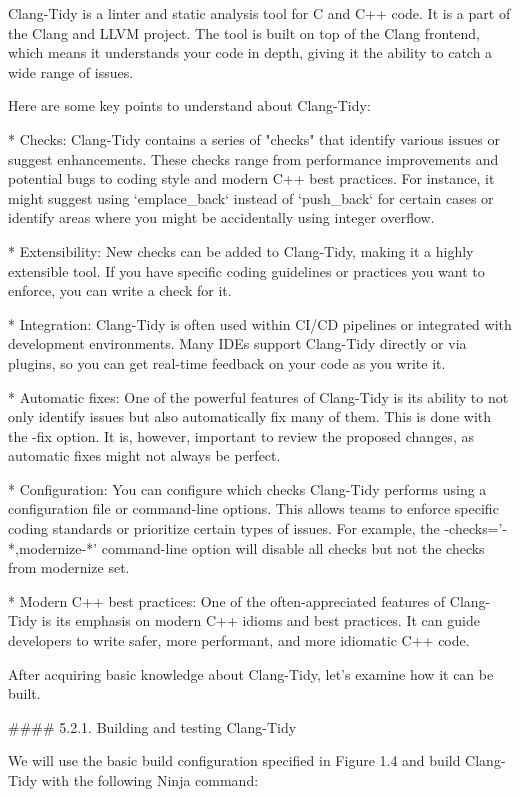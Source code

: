 
\begin{markdown}

Clang-Tidy is a linter and static analysis tool for C and C++ code. It is a part of the Clang and LLVM project. The tool is built on top of the Clang frontend, which means it understands your code in depth, giving it the ability to catch a wide range of issues.

Here are some key points to understand about Clang-Tidy:

* Checks: Clang-Tidy contains a series of "checks" that identify various issues or suggest enhancements. These checks range from performance improvements and potential bugs to coding style and modern C++ best practices. For instance, it might suggest using `emplace_back` instead of `push_back` for certain cases or identify areas where you might be accidentally using integer overflow.

* Extensibility: New checks can be added to Clang-Tidy, making it a highly extensible tool. If you have specific coding guidelines or practices you want to enforce, you can write a check for it.

* Integration: Clang-Tidy is often used within CI/CD pipelines or integrated with development environments. Many IDEs support Clang-Tidy directly or via plugins, so you can get real-time feedback on your code as you write it.

* Automatic fixes: One of the powerful features of Clang-Tidy is its ability to not only identify issues but also automatically fix many of them. This is done with the -fix option. It is, however, important to review the proposed changes, as automatic fixes might not always be perfect.

* Configuration: You can configure which checks Clang-Tidy performs using a configuration file or command-line options. This allows teams to enforce specific coding standards or prioritize certain types of issues. For example, the -checks='-*,modernize-*' command-line option will disable all checks but not the checks from modernize set.

* Modern C++ best practices: One of the often-appreciated features of Clang-Tidy is its emphasis on modern C++ idioms and best practices. It can guide developers to write safer, more performant, and more idiomatic C++ code.

After acquiring basic knowledge about Clang-Tidy, let's examine how it can be built.


#### 5.2.1. Building and testing Clang-Tidy

We will use the basic build configuration specified in Figure 1.4 and build Clang-Tidy with the following Ninja command:

\end{markdown}

